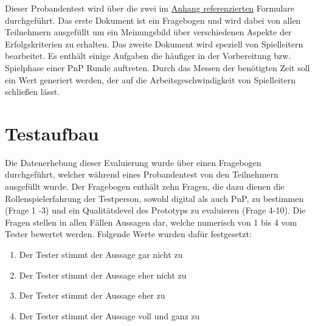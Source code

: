 Dieser Probandentest wird über die zwei im \hyperlink{AppendixFragebogenA.1}{Anhang referenzierten} Formulare durchgeführt. Das erste Dokument ist ein Fragebogen und wird dabei von allen Teilnehmern ausgefüllt um ein Meinungsbild über verschiedenen Aspekte der Erfolgskriterien zu erhalten. Das zweite Dokument wird speziell von Spielleitern bearbeitet. Es enthält einige Aufgaben die häufiger in der Vorbereitung bzw. Spielphase einer PnP Runde auftreten. Durch das Messen der benötigten Zeit soll ein Wert generiert werden, der auf die Arbeitsgeschwindigkeit von Spielleitern schließen lässt.



\section{Testaufbau}
\label{sec:Testaufbau}
Die Datenerhebung dieser Evaluierung wurde über einen Fragebogen durchgeführt, welcher während eines Probandentest von den Teilnehmern ausgefüllt wurde. Der Fragebogen enthält zehn Fragen, die dazu dienen die Rollenspielerfahrung der Testperson, sowohl digital als auch PnP, zu bestimmen (Frage 1 -3) und ein Qualitätslevel des Prototyps zu evaluieren (Frage 4-10). Die Fragen stellen in allen Fällen Aussagen dar, welche numerisch von 1 bis 4 vom Tester bewertet werden. Folgende Werte wurden dafür festgesetzt:

\begin{enumerate}
	\item Der Tester stimmt der Aussage gar nicht zu
	\item Der Tester stimmt der Aussage eher nicht zu
	\item Der Tester stimmt der Aussage eher zu
	\item Der Tester stimmt der Aussage voll und ganz zu
\end{enumerate}

